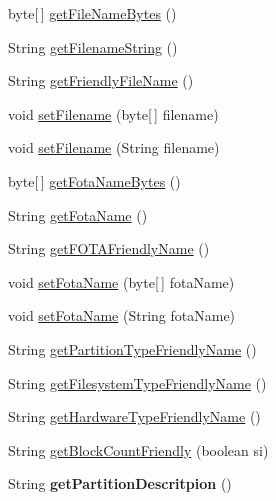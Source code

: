 \begin{DoxyCompactItemize}
\item 
byte\mbox{[}$\,$\mbox{]} \hyperlink{classcom_1_1casual__dev_1_1libpitX_1_1PitEntry_acea03a14dd52ba79a31e77108cb2c3e8}{get\-File\-Name\-Bytes} ()
\item 
String \hyperlink{classcom_1_1casual__dev_1_1libpitX_1_1PitEntry_a74847ea9d6d65ff9693838438242bb64}{get\-Filename\-String} ()
\item 
String \hyperlink{classcom_1_1casual__dev_1_1libpitX_1_1PitEntry_a25b468609d8a2b259b4b01dac4ca60ce}{get\-Friendly\-File\-Name} ()
\item 
void \hyperlink{classcom_1_1casual__dev_1_1libpitX_1_1PitEntry_acaf9449284b2b9a4705ee0142707645c}{set\-Filename} (byte\mbox{[}$\,$\mbox{]} filename)
\item 
void \hyperlink{classcom_1_1casual__dev_1_1libpitX_1_1PitEntry_ac23c8769b1610befb3ba95530e470cd0}{set\-Filename} (String filename)
\item 
byte\mbox{[}$\,$\mbox{]} \hyperlink{classcom_1_1casual__dev_1_1libpitX_1_1PitEntry_a2e2c8438b928d7f250d6aca0f4215f4b}{get\-Fota\-Name\-Bytes} ()
\item 
String \hyperlink{classcom_1_1casual__dev_1_1libpitX_1_1PitEntry_a50e74a38bdc61ab5011549285965c07f}{get\-Fota\-Name} ()
\item 
String \hyperlink{classcom_1_1casual__dev_1_1libpitX_1_1PitEntry_a8e4629067622bece1e080e533aa688d0}{get\-F\-O\-T\-A\-Friendly\-Name} ()
\item 
void \hyperlink{classcom_1_1casual__dev_1_1libpitX_1_1PitEntry_a0c8afaab9a0b52020d26a73de3f8c531}{set\-Fota\-Name} (byte\mbox{[}$\,$\mbox{]} fota\-Name)
\item 
void \hyperlink{classcom_1_1casual__dev_1_1libpitX_1_1PitEntry_aacf449d564d669ec739f3a633413b7de}{set\-Fota\-Name} (String fota\-Name)
\item 
String \hyperlink{classcom_1_1casual__dev_1_1libpitX_1_1PitEntry_a7b646425ad13f3c7497d9b0308e48823}{get\-Partition\-Type\-Friendly\-Name} ()
\item 
String \hyperlink{classcom_1_1casual__dev_1_1libpitX_1_1PitEntry_aca73e7134dd5bbcb220ef16e1ee1937c}{get\-Filesystem\-Type\-Friendly\-Name} ()
\item 
String \hyperlink{classcom_1_1casual__dev_1_1libpitX_1_1PitEntry_a54e6e6974b56c0e6c219dc32ecda5158}{get\-Hardware\-Type\-Friendly\-Name} ()
\item 
String \hyperlink{classcom_1_1casual__dev_1_1libpitX_1_1PitEntry_aead678d125364dede2fa82dc6b25c14b}{get\-Block\-Count\-Friendly} (boolean si)
\item 
\hypertarget{classcom_1_1casual__dev_1_1libpitX_1_1PitEntry_a89eca091c3df99ea0d09c4697d3f0205}{String {\bfseries get\-Partition\-Descritpion} ()}\label{classcom_1_1casual__dev_1_1libpitX_1_1PitEntry_a89eca091c3df99ea0d09c4697d3f0205}


\end{DoxyCompactItemize}
